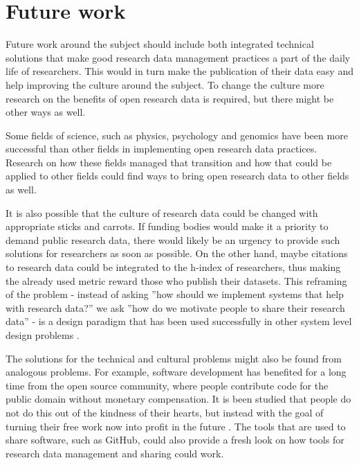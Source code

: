 \section{Future work}

Future work around the subject should include both integrated
technical solutions that make good research data management practices a part of the
daily life of researchers. This would in turn make the publication of their data easy
and help improving the culture around the subject.
To change the culture more research on the benefits of open research data
is required, but there might be other ways as well.

Some fields of science, such as physics, psychology and genomics have been
more successful than other fields in implementing open research data practices.
Research on how these fields managed that transition and how that could be applied
to other fields could find ways to bring open research data to other
fields as well.

It is also possible that the culture of research data could be changed with
appropriate sticks and carrots. If funding bodies would make it a priority
to demand public research data, there would likely be an urgency to provide
such solutions for researchers as soon as possible. On the other hand, maybe
citations to research data could be integrated to the h-index of researchers,
thus making the already used metric reward those who publish their datasets.
This reframing of the problem - instead of asking ''how should we implement
systems that help with research data?'' we ask ''how do we motivate people
to share their research data'' - is a design paradigm that has been used
successfully in other system level design problems \cite{dorst2015frame}.

The solutions for the technical and cultural problems might also be found
from analogous problems. For example, software development has benefited for
a long time from the open source community, where people contribute code for
the public domain without monetary compensation. It is been studied that people do not
do this out of the kindness of their hearts, but instead with the goal of
turning their free work now into profit in the future
\cite{DBLP:conf/hicss/HarsO01}. The tools that are used to share software,
such as GitHub, could also provide a fresh look on how tools for research
data management and sharing could work.

\iffalse
In this chapter we will discuss the findings, methods and such in a good
scientific manner.

At some point I want to discuss the analogue of software open source community
and how that works - how we should make people proud of making good, usable
datasets and sharing them.

\cite{DBLP:conf/hicss/HarsO01} is about the motivations behind working on open
source software - could be used for analogue for open data.

\cite{dorst2015frame} is the Kees Dorst book about reframing problems, which in
this case would be taking the technical problem of sharing reserch data, which
is not the actual problem, and reframing it as the problem on how to motivat
people to to share their data.
\fi
